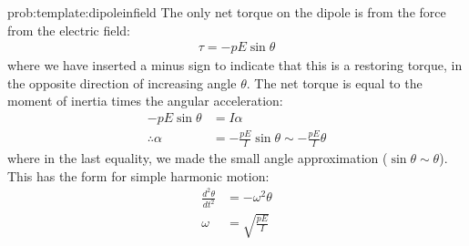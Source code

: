 \begin{solution}{prob:template:dipoleinfield}\label{soln:template:dipoleinfield}
The only net torque on the dipole is from the force from the electric field:
\begin{align*}
\tau = -pE\sin\theta 
\end{align*}
where we have inserted a minus sign to indicate that this is a restoring torque, in the opposite direction of increasing angle $\theta$. The net torque is equal to the moment of inertia times the angular acceleration:
\begin{align*}
-pE\sin\theta &= I\alpha\\
\therefore \alpha &= -\frac{pE}{I}\sin\theta\sim-\frac{pE}{I}\theta
\end{align*}
where in the last equality, we made the small angle approximation ($\sin\theta\sim\theta$). This has the form for simple harmonic motion:
\begin{align*}
\frac{d^2\theta}{dt^2}&=-\omega^2 \theta\\
\omega &=\sqrt{\frac{pE}{I}}
\end{align*}
\end{solution}

